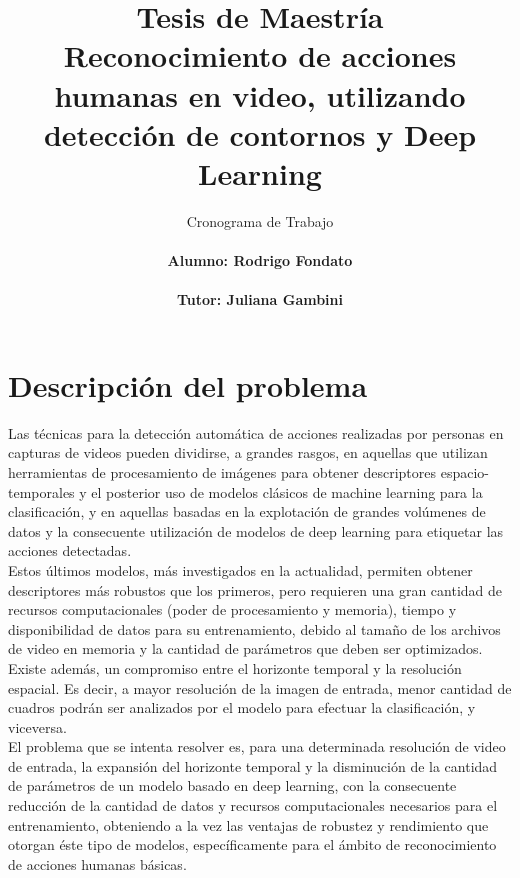 \documentclass[10pt]{article}
\begin{document}
\title{{\bf Tesis de Maestría}\\ Reconocimiento de acciones humanas en video, utilizando detección de contornos y Deep Learning
}
\author{Cronograma de Trabajo \\
	\ \\
	 \bf{Alumno}: Rodrigo Fondato\\
 \ \\
\bf{Tutor: Juliana Gambini}}
\date{}
\maketitle
	\Large{\textbf{}}
	
\section{Descripción del problema}


Las técnicas para la detección automática de acciones realizadas por personas en capturas de videos pueden dividirse, a grandes rasgos, en aquellas que utilizan herramientas de procesamiento de imágenes para obtener descriptores espacio-temporales y el posterior uso de modelos clásicos de machine learning para la clasificación, y en aquellas basadas en la explotación de grandes volúmenes de datos y la consecuente utilización de modelos de deep learning para etiquetar las acciones detectadas. \\

Estos últimos modelos, más investigados en la actualidad, permiten obtener descriptores más robustos que los primeros, pero requieren una gran cantidad de recursos computacionales (poder de procesamiento y memoria), tiempo y disponibilidad de datos para su entrenamiento, debido al tamaño de los archivos de video en memoria y la cantidad de parámetros que deben ser optimizados. Existe además, un compromiso entre el horizonte temporal y la resolución espacial. Es decir, a mayor resolución de la imagen de entrada, menor cantidad de cuadros podrán ser analizados por el modelo para efectuar la clasificación, y viceversa. \\

El problema que se intenta resolver es, para una determinada resolución de video de entrada, la expansión del horizonte temporal y la disminución de la cantidad de parámetros de un modelo basado en deep learning, con la consecuente reducción de la cantidad de datos y recursos computacionales necesarios para el entrenamiento, obteniendo a la vez las ventajas de robustez y rendimiento que otorgan éste tipo de modelos, específicamente para el ámbito de reconocimiento de acciones humanas básicas.
\end{document}
